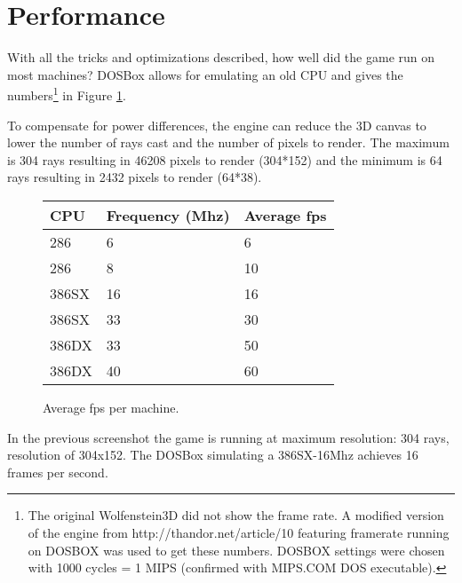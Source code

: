\section{Performance}
With all the tricks and optimizations described, how well did the game run on most machines? DOSBox allows for emulating an old CPU and gives the numbers\footnote{The original Wolfenstein3D did not show the frame rate. A modified version of the engine from http://thandor.net/article/10 featuring framerate running on DOSBOX was used to get these numbers. DOSBOX settings were chosen with 1000 cycles = 1 MIPS (confirmed with MIPS.COM DOS executable).} in Figure \ref{perf_summary}.\\
\par

To compensate for power differences, the engine can reduce the 3D canvas to lower the number of rays cast and the number of pixels to render. The maximum is 304 rays resulting in 46208 pixels to render (304*152) and the minimum is 64 rays resulting in 2432 pixels to render (64*38).\\
\par
\begin{figure}[H]
\centering
\begin{tabularx}{\textwidth}{ X X X }
  \toprule
  \textbf{CPU} & \textbf{Frequency (Mhz)} & \textbf{Average fps} \\ \bottomrule
 286 & 6 & 6 \\
 286 & 8 & 10 \\
 386SX & 16 &  16 \\
 386SX & 33 & 30 \\
 386DX & 33 & 50 \\
 386DX & 40 & 60 \\ \bottomrule
\end{tabularx}
\caption{Average fps per machine.}
\label{perf_summary}
\end{figure}


  \begin{figure}[H]
\centering
 \end{figure}
 \par
 In the previous screenshot the game is running at maximum resolution: 304 rays, resolution of 304x152. The DOSBox simulating a 386SX-16Mhz achieves 16 frames per second.

   \begin{figure}[H]
\centering
 \end{figure}
 \par

